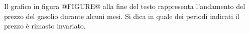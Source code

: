 Il grafico in figura @FIGURE@ alla fine del testo
rappresenta l'andamento del prezzo del gasolio durante alcuni mesi. 
Si dica in quale dei periodi indicati il prezzo è rimasto invariato.
